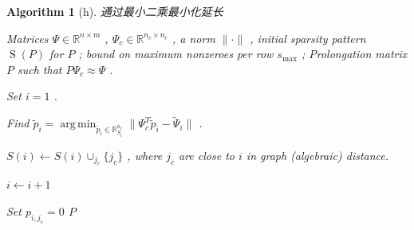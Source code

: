 \documentclass[12pt]{acta_2011xz}
\newcommand{\sparse}{\ensuremath{\operatorname{S}}}
\newtheorem{algorithm}[equation]{Algorithm}
\DeclareMathOperator*{\argmin}{arg\,min}
\begin{document}
   \begin{algorithm}[h]   \caption{通过最小二乘最小化延长    \label{a:P-LS}     }    
   \begin{algorithmic}[1]
   Matrices               $\Psi\in \mathbb{R}^{n\times m}$              , 
              $\Psi_c\in \mathbb{R}^{n_c\times n_c}$              , a norm               $\|\cdot\|$              , 
  initial sparsity pattern               $\sparse(P)$               
for               $P$              ; bound on maximum nonzeroes per row               $s_{\max{}}$              ;  
 Prolongation matrix               $P$               such that               $P\Psi_c \approx \Psi$              .  

\State Set               $i=1$              .


\State  Find 
              $\widetilde p_i=\argmin_{\widetilde p_i\in \mathbb R^{n_c}_{S_i}}\|\Psi_c^T\widetilde p_i-\widetilde \Psi_i\|$              .


\State               $S(i) \leftarrow S(i) \cup_{j_c}  \{ j_c \} $              , where               $j_c$               are close to
              $i$               in graph (algebraic) distance.

\Else 

\State               $i\leftarrow i+1$              

\EndIf

\EndWhile
{} 
 Set               $p_{i,j_c}=0$               \EndIIf
\EndFor
\State \Return               $P$              
\end{algorithmic}     \end{algorithm}     
\end{document}
